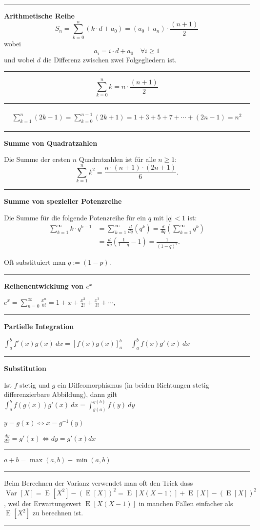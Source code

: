 \documentclass[a4paper, 12pt]{extarticle}
\newcommand{\sep}{\vspace{5pt}\noindent\hrule\vspace{5pt}}
\newcommand{\abs}[1]{\left\lvert #1 \right\rvert}
\newcommand{\Var}[2][]{\operatorname{Var}_{#1}\left[ #2 \right]}
\newcommand{\Exp}[2][]{\operatorname{E}_{#1}\left[ #2 \right]}
\begin{document}
\begin{multicols*}{2}
\sep

\textbf{Arithmetische Reihe}
\[
S_n = \sum_{k=0}^{n}\left(k\cdot d + a_0\right)= (a_0+a_n) \cdot \frac{(n+1)}{2}
\]
wobei
\[
a_i = i\cdot d + a_0 \quad \forall i\geq 1
\]
und wobei $d$ die Differenz zwischen zwei Folgegliedern ist.

\sep

\[
\sum_{k=0}^n k = n\cdot \frac{(n+1)}{2}
\]

\sep

\begin{gather*}
\sum_{k=1}^n(2k-1) = \sum_{k=0}^{n-1}(2k+1) = 1 + 3 + 5 + 7 +\cdots+ (2n-1) =
n^2
\end{gather*}

\sep

\textbf{Summe von Quadratzahlen}

Die Summe der ersten $n$ Quadratzahlen ist für alle $n\geq 1$:
\[
\sum_{k=1}^n k^2 = \frac{n \cdot (n+1) \cdot (2n+1)}{6}.
\]

\sep

\textbf{Summe von spezieller Potenzreihe}

Die Summe für die folgende Potenzreihe für ein $q$ 
mit $\abs{q}<1$ ist:
\begin{align*}
\sum_{k=1}^\infty k\cdot q^{k-1}
&=
\sum_{k=1}^\infty \frac{d}{d q} (q^k)
=
\frac{d}{d q}\left(\sum_{k=1}^\infty q^k\right)
\\
&=
\frac{d}{d q}\left(\frac{1}{1-q} -1\right)
=
\frac{1}{(1-q)^2}.
\end{align*}

\Com Oft substituiert man $q:=(1-p)$.


\sep

\textbf{Reihenentwicklung von $e^x$}

$e^x = \sum_{n=0}^\infty \frac{x^n}{n!} = 1 + x + \frac{x^2}{2!}
 + \frac{x^3}{3!} + \cdots,$

\sep

\textbf{Partielle Integration}

$
\int_a^b f'(x)g(x) \ dx = \left[f(x)g(x)\right]_a^b - \int_a^b f(x)g'(x) \ dx
$
\sep

\textbf{Substitution}

Ist $f$ stetig und $g$ ein Diffeomorphismus (in beiden Richtungen stetig
differenzierbare Abbildung), dann gilt
$
\int_a^b f(g(x))g'(x) \ dx = \int_{g(a)}^{g(b)} f(y) \ dy
$

$
y = g(x)	\Longleftrightarrow x = g^{-1}(y)
$

$
\frac{dy}{dx} = g'(x) \Longleftrightarrow dy = g'(x) dx
$

\sep

$
a + b = \max(a,b) + \min(a,b)
$

\sep

Beim Berechnen der Varianz verwendet man oft den Trick dass
$\Var{X}=\Exp{X^2}-(\Exp{X})^2 = \Exp{X(X-1)}+\Exp{X}-(\Exp{X})^2$, weil der
Erwartungswert $\Exp{X(X-1)}$ in manchen Fällen einfacher als $\Exp{X^2}$ zu
berechnen ist.

\sep

\end{multicols*}
\end{document}
